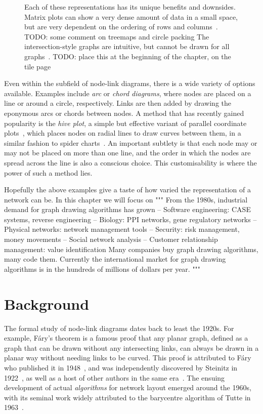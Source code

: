 \begin{figure}
\caption{Each of these representations has its unique benefits and downsides. Matrix plots can show a very dense amount of data in a small space, but are very dependent on the ordering of rows and columns~\cite{TODO}.
TODO: some comment on treemaps and circle packing
The intersection-style graphs are intuitive, but cannot be drawn for all graphs~\cite{TODO}.
TODO: place this at the beginning of the chapter, on the tile page}
\label{graphrepresentations}
\end{figure}

Even within the subfield of node-link diagrams, there is a wide variety of options available.
Examples include \emph{arc} or \emph{chord diagrams}, where nodes are placed on a line or around a circle, respectively. Links are then added by drawing the eponymous arcs or chords between nodes.
A method that has recently gained popularity is the \emph{hive plot}, a simple but effective variant of parallel coordinate plots~\cite{TODO}, which places nodes on radial lines to draw curves between them, in a similar fashion to spider charts~\cite{TODO}. An important subtlety is that each node may or may not be placed on more than one line, and the order in which the nodes are spread across the line is also a conscious choice. This customisability is where the power of such a method lies.

Hopefully the above examples give a taste of how varied the representation of a network can be. In this chapter we will focus on 
"""
 From the 1980s, industrial demand for graph drawing algorithms has grown
– Software engineering: CASE systems, reverse engineering – Biology: PPI networks, gene regulatory networks
– Physical networks: network management tools
– Security: risk management, money movements
– Social network analysis
– Customer relationship management: value identification Many companies buy graph drawing algorithms, many code them.
Currently the international market for graph drawing algorithms is in the hundreds of millions of dollars per year.
"""

\section{Background}
The formal study of node-link diagrams dates back to least the 1920s. For example, F\'ary's theorem is a famous proof that any planar graph, defined as a graph that can be drawn without any intersecting links, can always be drawn in a planar way without needing links to be curved. This proof is attributed to F\'ary who published it in 1948~\cite{TODO}, and was independently discovered by Steinitz in 1922~\cite{TODO}, as well as a host of other authors in the same era~\cite{wagner1936, koebe1936, stein1951}.
The ensuing development of actual \emph{algorithms} for network layout emerged around the 1960s, with its seminal work widely attributed to the barycentre algorithm of Tutte in 1963~\cite{TODO}. 

